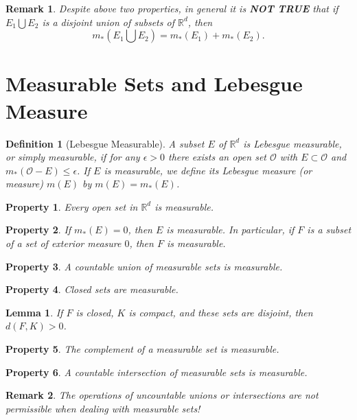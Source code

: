 \documentclass{report}
\theoremstyle{upthm}
\newtheorem{defn}{Definition}
\newtheorem{lemma}{Lemma}
\newtheorem{remark}{Remark}
\newtheorem{property}{Property}
\newcommand{\reals}{\mathbb{R}}
\newcommand{\calO}{{\mathcal{O}}}
\newcommand{\union}{\bigcup}
\begin{document}
\begin{remark}
	Despite above two properties, in general it is {\bf NOT TRUE} that if $E_1 \union E_2$ is a disjoint union of subsets of $\reals^d$, then
	$$ m_*(E_1 \union E_2) = m_*(E_1) + m_*(E_2) .$$
\end{remark}

\section{Measurable Sets and Lebesgue Measure}

\begin{defn}[Lebesgue Measurable]
	A subset $E$ of $\reals^d$ is Lebesgue measurable, or simply measurable, if for any $ \epsilon > 0$ there exists an open set $\calO$ with $E \subset \calO$ and $m_*(\calO - E) \leq \epsilon$. If $E$ is measurable, we define its Lebesgue measure (or measure) $m(E)$ by $m(E) = m_*(E)$.
\end{defn}

\begin{property}
	Every open set in $\reals^d$ is measurable.
\end{property}

\begin{property}
	If $m_*(E) = 0$, then $E$ is measurable. In particular, if $F$ is a subset of a set of exterior measure $0$, then $F$ is measurable.
\end{property}

\begin{property}
	A countable union of measurable sets is measurable.
\end{property}

\begin{property}
	Closed sets are measurable.
\end{property}

\begin{lemma}
	If $F$ is closed, $K$ is compact, and these sets are disjoint, then $d(F,K) > 0$.
\end{lemma}

\begin{property}
	The complement of a measurable set is measurable.
\end{property}

\begin{property}
	A countable intersection of measurable sets is measurable.
\end{property}

\begin{remark}
	The operations of uncountable unions or intersections are not permissible when dealing with measurable sets!
\end{remark}
\end{document}
